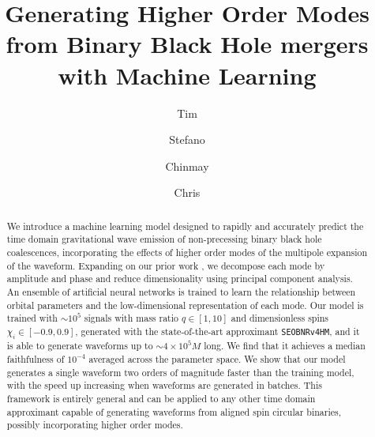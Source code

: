 \documentclass[twocolumn,showpacs,preprintnumbers,nofootinbib,prd,
superscriptaddress,10pt]{revtex4-2}
\begin{document}
\begin{abstract}
We introduce a machine learning model designed to rapidly and accurately predict the time domain gravitational wave emission of non-precessing binary black hole coalescences, incorporating the effects of higher order modes of the multipole expansion of the waveform. 
Expanding on our prior work \cite{Schmidt:2020yuu}, we decompose each mode by amplitude and phase and reduce dimensionality using principal component analysis. An ensemble of artificial neural networks is trained to learn the relationship between orbital parameters and the low-dimensional representation of each mode.
Our model is trained with $\sim 10^5$ signals with mass ratio $q \in [1,10]$ and dimensionless spins $\chi_i \in [-0.9, 0.9]$, generated with the state-of-the-art approximant \texttt{SEOBNRv4HM}, and it is able to generate waveforms up to $\sim 4\times 10^5 M$ long. We find that it achieves a median faithfulness of $10^{-4}$ averaged across the parameter space. We show that our model generates a single waveform two orders of magnitude faster than the training model, with the speed up increasing when waveforms are generated in batches.
This framework is entirely general and can be applied to any other time domain approximant capable of generating waveforms from aligned spin circular binaries, possibly incorporating higher order modes.
\end{abstract}
	
	\title{Generating Higher Order Modes from Binary Black Hole mergers with Machine Learning}
	\author{Tim }
	\author{Stefano  }
	\author{Chinmay  }
	\author{Chris  }
	\maketitle
\end{document}
